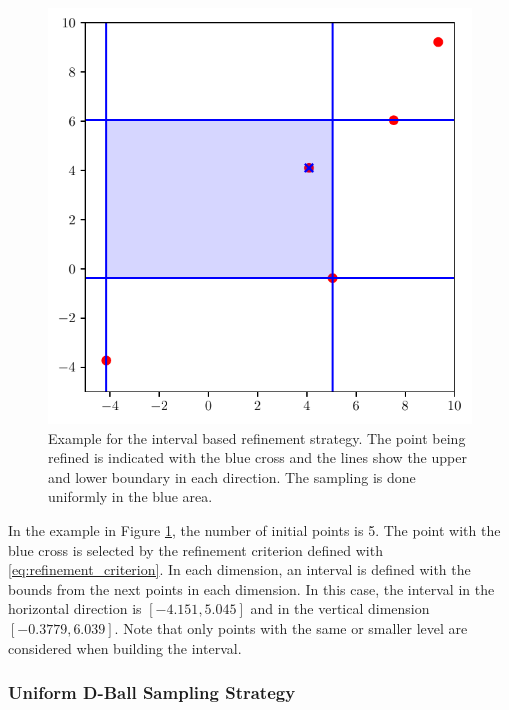 \begin{figure}[H]
	\centering
	\includegraphics[scale=0.8]{figures/Adaptive_random/Visualizations/Alternative_1}
	\caption{ Example for the interval based refinement strategy. The point being refined is indicated with the blue cross and the lines show the upper and lower boundary in each direction. The sampling is done uniformly in the blue area. }
	\label{fig:alternative_1}
\end{figure}

In the example in Figure \ref{fig:alternative_1}, the number of initial points is 5. The point with the blue cross is selected by the refinement criterion defined with \ref{eq:refinement_criterion}. In each dimension, an interval is defined with the bounds from the next points in each dimension. In this case, the interval in the horizontal direction is $ [-4.151, 5.045] $ and in the vertical dimension $ [-0.3779, 6.039] $. Note that only points with the same or smaller level are considered when building the interval.

\subsubsection{Uniform D-Ball Sampling Strategy}

